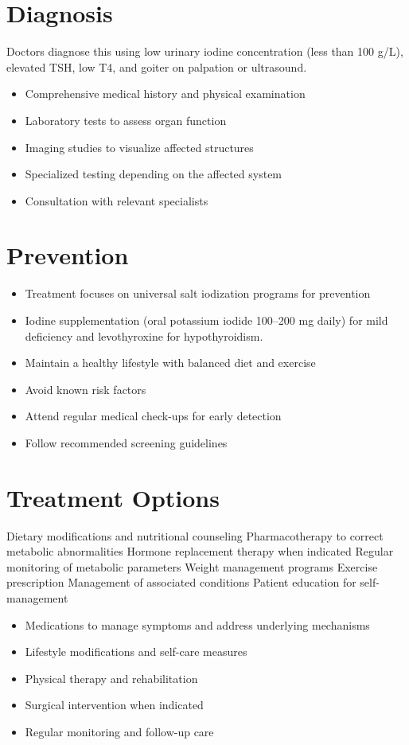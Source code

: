 \section{Diagnosis}
Doctors diagnose this using low urinary iodine concentration (less than 100 \textmu g/L), elevated TSH, low T4, and goiter on palpation or ultrasound.

\begin{itemize}[noitemsep]
  \item Comprehensive medical history and physical examination
  \item Laboratory tests to assess organ function
  \item Imaging studies to visualize affected structures
  \item Specialized testing depending on the affected system
  \item Consultation with relevant specialists
\end{itemize}
\section{Prevention}
\begin{itemize}[noitemsep]
  \item Treatment focuses on universal salt iodization programs for prevention
  \item Iodine supplementation (oral potassium iodide 100--200 mg daily) for mild deficiency and levothyroxine for hypothyroidism.
  \item Maintain a healthy lifestyle with balanced diet and exercise
  \item Avoid known risk factors
  \item Attend regular medical check-ups for early detection
  \item Follow recommended screening guidelines
\end{itemize}
\section{Treatment Options}
Dietary modifications and nutritional counseling Pharmacotherapy to correct metabolic abnormalities Hormone replacement therapy when indicated Regular monitoring of metabolic parameters Weight management programs Exercise prescription Management of associated conditions Patient education for self-management

\begin{itemize}[noitemsep]
  \item Medications to manage symptoms and address underlying mechanisms
  \item Lifestyle modifications and self-care measures
  \item Physical therapy and rehabilitation
  \item Surgical intervention when indicated
  \item Regular monitoring and follow-up care
\end{itemize}
